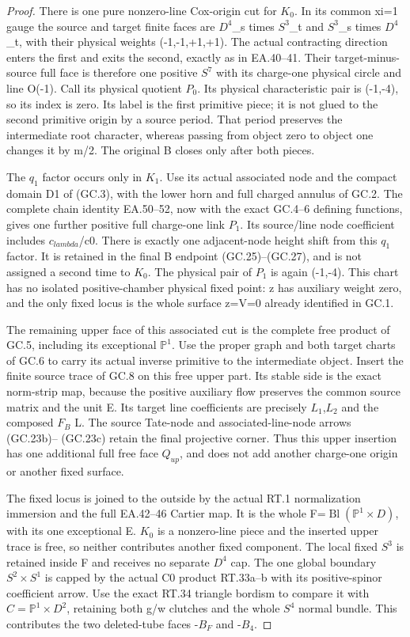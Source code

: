 \begin{proof}
There is one pure nonzero-line Cox-origin cut for \(K_0\). In its
common xi=1 gauge the source and target finite faces are
\(D^4\)\_s times \(S^3\)\_t and \(S^3\)\_s times \(D^4\)\_t, with their physical
weights (-1,-1,+1,+1). The actual contracting direction enters
the first and exits the second, exactly as in EA.40--41.
Their target-minus-source full face is therefore one positive
\(S^7\) with its charge-one physical circle and line O(-1).
Call its physical quotient \(P_0\). Its physical characteristic pair
is (-1,-4), so its index is zero. Its label is the first primitive
piece; it is not glued to the second primitive origin by a source
period. That period preserves the intermediate root character,
whereas passing from object zero to object one changes it by
m/2. The original B closes only after both pieces.

The \(q_1\) factor occurs only in \(K_1\). Use its actual associated node
and the compact domain D1 of (GC.3), with the lower horn and
full charged annulus of GC.2. The complete chain identity
EA.50--52, now with the exact GC.4--6 defining functions, gives
one further positive full charge-one link \(P_1\). Its source/line
node coefficient includes \(c_{lambda}\)/c0. There is exactly one
adjacent-node height shift from this \(q_1\) factor. It is retained
in the final B endpoint (GC.25)--(GC.27), and is not assigned
a second time to \(K_0\). The physical pair of \(P_1\) is again (-1,-4).
This chart has no isolated positive-chamber physical fixed point:
z has auxiliary weight zero, and the only fixed locus is the
whole surface z=V=0 already identified in GC.1.

The remaining upper face of this associated cut is the complete
free product of GC.5, including its exceptional \(\mathbb P^1\). Use the
proper graph and both target charts of GC.6 to carry its actual
inverse primitive to the intermediate object. Insert the finite
source trace of GC.8 on this free upper part. Its stable side
is the exact norm-strip map, because the positive auxiliary flow
preserves the common source matrix and the unit E. Its target
line coefficients are precisely \(L_1\),\(L_2\) and the composed \(F_{B}\) L.
The source Tate-node and associated-line-node arrows (GC.23b)--
(GC.23c) retain the final projective corner. Thus this upper
insertion has one additional full free face \(Q_{up}\), and does not
add another charge-one origin or another fixed surface.

The fixed locus is joined to the outside by the actual RT.1
normalization immersion and the full EA.42--46 Cartier map.
It is the whole F=\(\operatorname{Bl}(\mathbb P^1\times D)\), with its one exceptional E.
\(K_0\) is a nonzero-line piece and the inserted upper trace is free,
so neither contributes another fixed component. The local fixed
\(S^3\) is retained inside F and receives no separate \(D^4\) cap. The
one global boundary \(S^2\times S^1\) is capped by the actual C0
product RT.33a--b with its positive-spinor coefficient arrow.
Use the exact RT.34 triangle bordism to compare it with \(C=\mathbb P^1\times D^2\), retaining both g/w clutches and the whole \(S^4\) normal
bundle. This contributes the two deleted-tube faces -\(B_F\) and -\(B_4\).


\end{proof}
